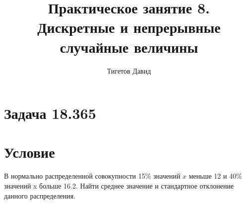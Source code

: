 \documentclass[12pt,a4paper]{article}
\begin{document}
    \title{Практическое занятие 8. \\ Дискретные и непрерывные случайные величины}
    \author{Тигетов Давид}
    \maketitle


    \section{Задача 18.365}
    \section*{Условие}
    В нормально распределенной совокупности 15\% значений $x$ меньше 12 и 40\% значений x больше 16.2. Найти среднее значение и стандартное отклонение данного распределения.
\end{document}

